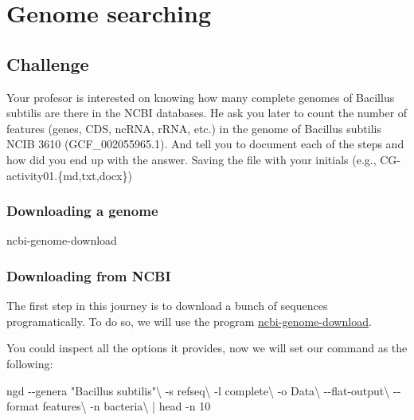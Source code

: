 \documentclass[
  letterpaper,
]{scrbook}
\newenvironment{Shaded}{\begin{snugshade}}{\end{snugshade}}
\newcommand{\AttributeTok}[1]{\textcolor[rgb]{0.40,0.46,0.14}{#1}}
\newcommand{\DataTypeTok}[1]{\textcolor[rgb]{0.68,0.00,0.00}{#1}}
\newcommand{\ExtensionTok}[1]{\textcolor[rgb]{0.00,0.46,0.62}{#1}}
\newcommand{\FunctionTok}[1]{\textcolor[rgb]{0.28,0.35,0.67}{#1}}
\newcommand{\KeywordTok}[1]{\textcolor[rgb]{0.00,0.46,0.62}{#1}}
\newcommand{\NormalTok}[1]{\textcolor[rgb]{0.00,0.46,0.62}{#1}}
\newcommand{\StringTok}[1]{\textcolor[rgb]{0.13,0.47,0.30}{#1}}
\begin{document}
\hypertarget{genome-searching}{%
\chapter{Genome searching}\label{genome-searching}}

\hypertarget{challenge}{%
\section*{Challenge}\label{challenge}}

Your profesor is interested on knowing how many complete genomes of
Bacillus subtilis are there in the NCBI databases. He ask you later to
count the number of features (genes, CDS, ncRNA, rRNA, etc.) in the
genome of Bacillus subtilis NCIB 3610 (GCF\_002055965.1). And tell you
to document each of the steps and how did you end up with the answer.
Saving the file with your initials (e.g., CG-activity01.\{md,txt,docx\})

\hypertarget{downloading-a-genome}{%
\subsection*{Downloading a genome}\label{downloading-a-genome}}

\begin{Shaded}
\begin{Highlighting}[]
\ExtensionTok{ncbi{-}genome{-}download}
\end{Highlighting}
\end{Shaded}

\hypertarget{downloading-from-ncbi}{%
\subsection*{Downloading from NCBI}\label{downloading-from-ncbi}}

The first step in this journey is to download a bunch of sequences
programatically. To do so, we will use the program
\href{https://github.com/kblin/ncbi-genome-download}{ncbi-genome-download}.

You could inspect all the options it provides, now we will set our
command as the following:

\begin{Shaded}
\begin{Highlighting}[]
\ExtensionTok{ngd} \AttributeTok{{-}{-}genera} \StringTok{"Bacillus subtilis"}\DataTypeTok{\textbackslash{}}
    \AttributeTok{{-}s}\NormalTok{ refseq}\DataTypeTok{\textbackslash{}}
    \AttributeTok{{-}l}\NormalTok{ complete}\DataTypeTok{\textbackslash{}}
    \AttributeTok{{-}o}\NormalTok{ Data}\DataTypeTok{\textbackslash{}}
    \AttributeTok{{-}{-}flat{-}output}\DataTypeTok{\textbackslash{}}
    \AttributeTok{{-}{-}format}\NormalTok{ features}\DataTypeTok{\textbackslash{}}
    \AttributeTok{{-}n}\NormalTok{ bacteria}\DataTypeTok{\textbackslash{}}
    \KeywordTok{|} \FunctionTok{head} \AttributeTok{{-}n}\NormalTok{ 10}
\end{Highlighting}
\end{Shaded}
\end{document}
